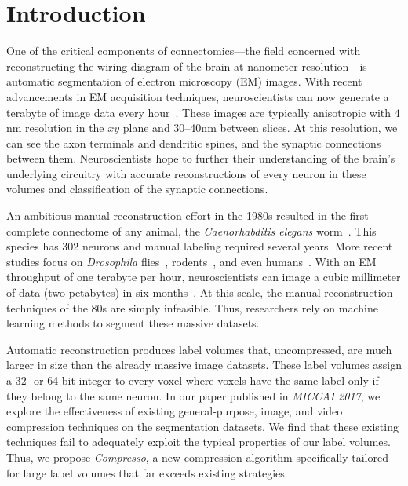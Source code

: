 \section{Introduction}

One of the critical components of connectomics---the field concerned with reconstructing the wiring diagram of the brain at nanometer resolution---is automatic segmentation of electron microscopy (EM) images.
With recent advancements in EM acquisition techniques, neuroscientists can now generate a terabyte of image data every hour~\cite{richard2016imaging}.
These images are typically anisotropic with $4$nm resolution in the $xy$ plane and \numrange{30}{40}nm between slices. 
At this resolution, we can see the axon terminals and dendritic spines, and the synaptic connections between them.
Neuroscientists hope to further their understanding of the brain's underlying circuitry with accurate reconstructions of every neuron in these volumes and classification of the synaptic connections.


An ambitious manual reconstruction effort in the 1980s resulted in the first complete connectome of any animal, the \textit{Caenorhabditis elegans} worm~\cite{white1986structure}. 
This species has 302 neurons and manual labeling required several years.
More recent studies focus on \textit{Drosophila} flies~\cite{jovanic2016competitive,takemura2015synaptic},  rodents~\cite{richard2016imaging}, and even humans~\cite{sporns2005human}. 
With an EM throughput of one terabyte per hour, neuroscientists can image a cubic millimeter of data (two petabytes) in six months~\cite{suissa2016automatic}. 
At this scale, the manual reconstruction techniques of the 80s are simply infeasible.
Thus, researchers rely on machine learning methods to segment these massive datasets.

Automatic reconstruction produces label volumes that, uncompressed, are much larger in size than the already massive image datasets.
These label volumes assign a 32- or 64-bit integer to every voxel where voxels have the same label only if they belong to the same neuron.
In our paper published in \textit{MICCAI 2017}, we explore the effectiveness of existing general-purpose, image, and video compression techniques on the segmentation datasets.
We find that these existing techniques fail to adequately exploit the typical properties of our label volumes.
Thus, we propose \textit{Compresso}, a new compression algorithm specifically tailored for large label volumes that far exceeds existing strategies.


